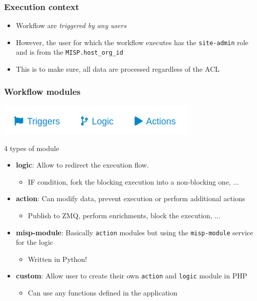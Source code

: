 \begin{frame}
    \frametitle{Execution context}
    \begin{itemize}
        \item Workflow are \textit{triggered by any users}
        \item However, the user for which the workflow executes has the \texttt{site-admin} role and is from the \texttt{MISP.host\_org\_id}
        \item This is to make sure, all data are processed regardless of the ACL
    \end{itemize}
\end{frame}

\begin{frame}
    \frametitle{Workflow modules}
    \begin{center}
        \includegraphics[width=0.5\linewidth]{pictures/module-type.png}
    \end{center}
    4 types of module
    \begin{itemize}
        \item \textbf{logic}: Allow to redirect the execution flow.
        \begin{itemize}
            \item IF condition, fork the blocking execution into a non-blocking one, ...
        \end{itemize}
        \item \textbf{action}: Can modify data, prevent execution or perform additional actions
        \begin{itemize}
            \item Publish to ZMQ, perform enrichments, block the execution, ...
        \end{itemize}
        \item \textbf{misp-module}: Basically \texttt{action} modules but using the \texttt{misp-module} service for the logic
        \begin{itemize}
            \item Written in Python!
        \end{itemize}
        \item \textbf{custom}: Allow user to create their own \texttt{action} and \texttt{logic} module in PHP
        \begin{itemize}
            \item Can use any functions defined in the application
        \end{itemize}
    \end{itemize}
\end{frame}

